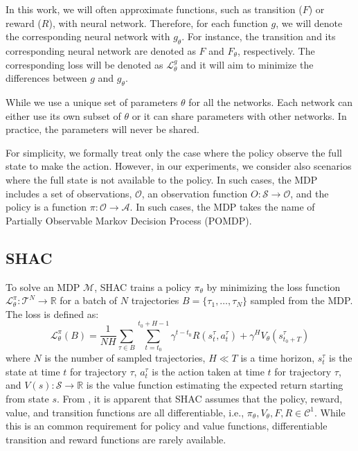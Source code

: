 In this work, we will often approximate functions, such as transition ($F$) or reward ($R$), with neural network. Therefore, for each function $g$, we will denote the corresponding neural network with $g_\theta$. For instance, the transition and its corresponding neural network are denoted as $F$ and $F_{\theta}$, respectively. The corresponding loss will be denoted as $\mathcal{L}_\theta^g$ and it will aim to minimize the differences between $g$ and $g_\theta$.

While we use a unique set of parameters $\theta$ for all the networks. Each network can either use its own subset of $\theta$ or it can share parameters with other networks. In practice, the parameters will never be shared.

For simplicity, we formally treat only the case where the policy observe the full state to make the action. However, in our experiments, we consider also scenarios where the full state is not available to the policy. In such cases, the MDP includes a set of observations, $\mathcal{O}$, an observation function $O:\mathcal{S}\rightarrow\mathcal{O}$, and the policy is a function $\pi:\mathcal{O}\rightarrow\mathcal{A}$. In such cases, the MDP takes the name of Partially Observable Markov Decision Process (POMDP). 

\subsection{SHAC}

To solve an MDP $\mathcal{M}$, SHAC trains a policy $\pi_\theta$ by minimizing the loss function $\mathcal{L}_\theta^{\pi}:\mathcal{T}^N\rightarrow\mathbb{R}$ for a batch of $N$ trajectories $B = \{\tau_1, \ldots, \tau_N\}$ sampled from the MDP. The loss is defined as:  
\begin{equation}\label{eq:shac}
    \mathcal{L}_\theta^{\pi}(B) = \frac{1}{NH}\sum_{\tau\in B} \sum_{t=t_0}^{t_0+H-1} \gamma^{t-t_0} R(s_t^\tau, a_t^\tau) + \gamma^H V_\theta(s^\tau_{t_0+T})
\end{equation}
where $N$ is the number of sampled trajectories, $H \ll T$ is a time horizon, $s_t^\tau$ is the state at time $t$ for trajectory $\tau$, $a_t^\tau$ is the action taken at time $t$ for trajectory $\tau$, and $V(s): \mathcal{S} \rightarrow \mathbb{R}$ is the value function estimating the expected return starting from state $s$. From , it is apparent that SHAC assumes that the policy, reward, value, and transition functions are all differentiable, i.e., $\pi_\theta,V_\theta,F,R \in \mathcal{C}^1$. While this is an common requirement for policy and value functions, differentiable transition and reward functions are rarely available. 

